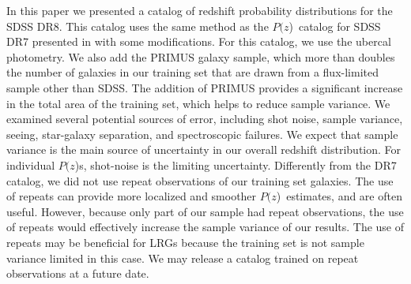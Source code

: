 \documentclass[preprint]{aastex}
\newcommand{\pofz}{$P(z$)}
\begin{document}
In this paper we presented a catalog of redshift probability distributions for
the SDSS DR8.  This catalog uses the same method as the \pofz\ catalog for SDSS
DR7 presented in \cite{CunhaPhotoz09} with some modifications.  For this
catalog, we use the ubercal photometry.  We also add the PRIMUS galaxy sample,
which more than doubles the number of galaxies in our training set that are
drawn from a flux-limited sample other than SDSS.  The addition of PRIMUS
provides a significant increase in the total area of the training set, which
helps to reduce sample variance.  We examined several potential sources of
error, including shot noise, sample variance, seeing, star-galaxy separation,
and spectroscopic failures.  We expect that sample variance is the main source
of uncertainty in our overall redshift distribution.  For individual \pofz s,
shot-noise is the limiting uncertainty.  Differently from the DR7 catalog, we
did not use repeat observations of our training set galaxies.  The use of
repeats can provide more localized and smoother \pofz\ estimates, and are often
useful.  However, because only part of our sample had repeat observations, the
use of repeats would effectively increase the sample variance of our results.
The use of repeats may be beneficial for LRGs because the training set is not
sample variance limited in this case.  We may release a catalog trained on
repeat observations at a future date.  
\end{document}
